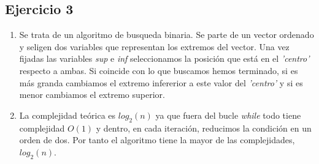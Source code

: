 \subsection*{Ejercicio 3}

\begin{enumerate}
\item Se trata de un algoritmo de busqueda binaria. Se parte de un
  vector ordenado y seligen dos variables que representan los extremos
  del vector. Una vez fijadas las variables \textit{sup} e
  \textit{inf} seleccionamos la posición que está en el
  \textit{'centro'} respecto a ambas. Si coincide con lo que buscamos
  hemos terminado, si es más granda cambiamos el extremo infererior a
  este valor del \textit{'centro'} y si es menor cambiamos el extremo
  superior.

\item La complejidad teórica es $log_2(n)$ ya que fuera del bucle
  \textit{while} todo tiene complejidad $O(1)$ y dentro, en cada
  iteración, reducimos la condición en un orden de dos. Por tanto el
  algoritmo tiene la mayor de las complejidades, $log_2(n)$.
\end{enumerate}

